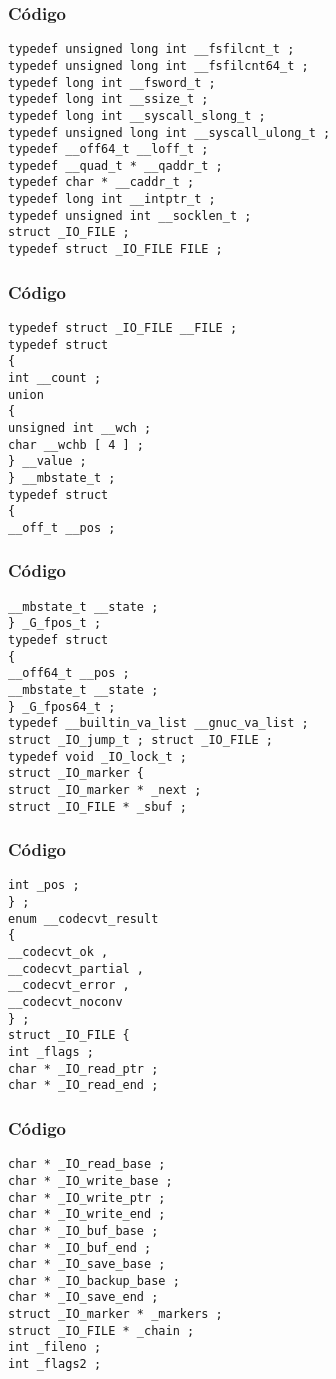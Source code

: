 \documentclass{beamer}
\begin{document}
\begin{frame}[fragile]
\frametitle{C\'odigo}
\begin{verbatim}
typedef unsigned long int __fsfilcnt_t ; 
typedef unsigned long int __fsfilcnt64_t ; 
typedef long int __fsword_t ; 
typedef long int __ssize_t ; 
typedef long int __syscall_slong_t ; 
typedef unsigned long int __syscall_ulong_t ; 
typedef __off64_t __loff_t ; 
typedef __quad_t * __qaddr_t ; 
typedef char * __caddr_t ; 
typedef long int __intptr_t ; 
typedef unsigned int __socklen_t ; 
struct _IO_FILE ; 
typedef struct _IO_FILE FILE ; 
\end{verbatim}
\end{frame}
\begin{frame}[fragile]
\frametitle{C\'odigo}
\begin{verbatim}
typedef struct _IO_FILE __FILE ; 
typedef struct 
{ 
int __count ; 
union 
{ 
unsigned int __wch ; 
char __wchb [ 4 ] ; 
} __value ; 
} __mbstate_t ; 
typedef struct 
{ 
__off_t __pos ; 
\end{verbatim}
\end{frame}
\begin{frame}[fragile]
\frametitle{C\'odigo}
\begin{verbatim}
__mbstate_t __state ; 
} _G_fpos_t ; 
typedef struct 
{ 
__off64_t __pos ; 
__mbstate_t __state ; 
} _G_fpos64_t ; 
typedef __builtin_va_list __gnuc_va_list ; 
struct _IO_jump_t ; struct _IO_FILE ; 
typedef void _IO_lock_t ; 
struct _IO_marker { 
struct _IO_marker * _next ; 
struct _IO_FILE * _sbuf ; 
\end{verbatim}
\end{frame}
\begin{frame}[fragile]
\frametitle{C\'odigo}
\begin{verbatim}
int _pos ; 
} ; 
enum __codecvt_result 
{ 
__codecvt_ok , 
__codecvt_partial , 
__codecvt_error , 
__codecvt_noconv 
} ; 
struct _IO_FILE { 
int _flags ; 
char * _IO_read_ptr ; 
char * _IO_read_end ; 
\end{verbatim}
\end{frame}
\begin{frame}[fragile]
\frametitle{C\'odigo}
\begin{verbatim}
char * _IO_read_base ; 
char * _IO_write_base ; 
char * _IO_write_ptr ; 
char * _IO_write_end ; 
char * _IO_buf_base ; 
char * _IO_buf_end ; 
char * _IO_save_base ; 
char * _IO_backup_base ; 
char * _IO_save_end ; 
struct _IO_marker * _markers ; 
struct _IO_FILE * _chain ; 
int _fileno ; 
int _flags2 ; 
\end{verbatim}
\end{frame}
\end{document}
